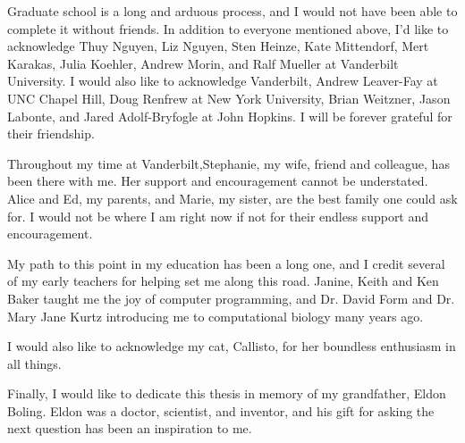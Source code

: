 Graduate school is a long and arduous process, and I would not have been able to complete it without friends.
In addition to everyone mentioned above, I'd like to acknowledge Thuy Nguyen, Liz Nguyen, Sten Heinze, Kate Mittendorf, Mert Karakas, Julia Koehler, Andrew Morin, and Ralf Mueller at Vanderbilt University.%
I would also like to acknowledge Vanderbilt, Andrew Leaver-Fay at UNC Chapel Hill, Doug Renfrew at New York University, Brian Weitzner, Jason Labonte, and Jared Adolf-Bryfogle at John Hopkins. %
I will be forever grateful for their friendship.

Throughout my time at Vanderbilt,Stephanie, my wife, friend and colleague, has been there with me.
Her support and encouragement cannot be understated.
Alice and Ed, my parents, and Marie, my sister, are the best family one could ask for.  I would not be where I am right now if not for their endless support and encouragement.

My path to this point in my education has been a long one, and I credit several of my early teachers for helping set me along this road.
Janine, Keith and Ken Baker taught me the joy of computer programming, and Dr. David Form and Dr. Mary Jane Kurtz introducing me to computational biology many years ago.

I would also like to acknowledge my cat, Callisto, for her boundless enthusiasm in all things.

Finally, I would like to dedicate this thesis in memory of my grandfather, Eldon Boling.
Eldon was a doctor, scientist, and inventor, and his gift for asking the next question has been an inspiration to me. 
